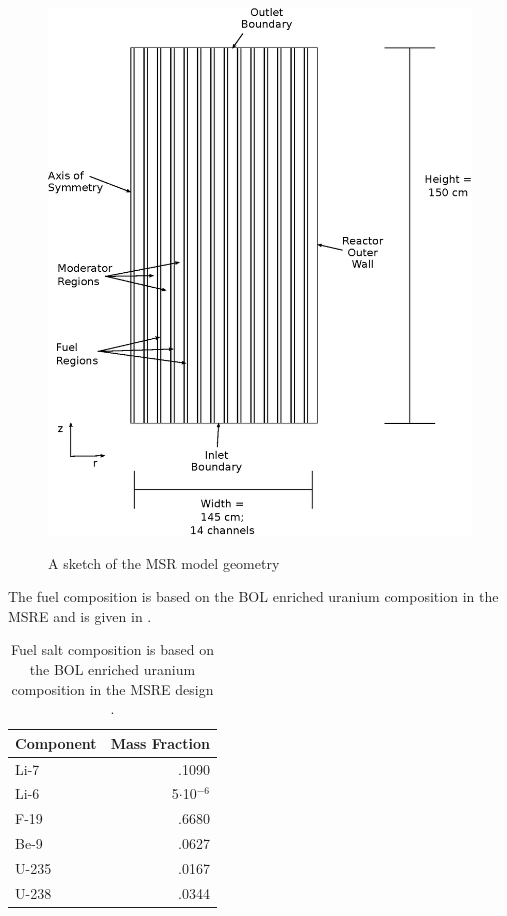 \documentclass{article}
\begin{document}
\begin{figure}
  \centering
  \includegraphics{geometry.eps}
  \label{fig:geom}
  \caption{A sketch of the \gls{MSR} model geometry}
\end{figure}


The fuel composition is based on the \gls{BOL} enriched uranium composition in the \gls{MSRE}
and is given in  \cite{robertson_msre_1965}.


\begin{table}[htpb]
  \begin{center}
    \begin{tabular}{l | r}
      Component & Mass Fraction\\\hline\hline
      Li-7 & .1090\\
      Li-6 & 5$\cdot$10$^{-6}$\\
      F-19 & .6680\\
      Be-9 & .0627\\
      U-235 & .0167\\
      U-238 & .0344\\
    \end{tabular}
  \end{center}
        \caption{Fuel salt composition is based on the \gls{BOL} enriched 
        uranium composition in the \gls{MSRE} design 
        \cite{robertson_msre_1965}.}
  \label{table:comp}
\end{table}
\end{document}
